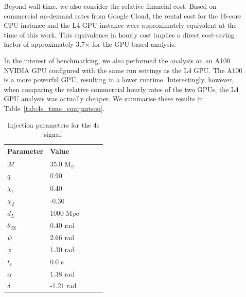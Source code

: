 \documentclass[fleqn,usenatbib]{mnras}
\begin{document}
Beyond wall-time, we also consider the relative financial cost. Based
on commercial on-demand rates from Google Cloud, the rental cost for the 16-core
CPU instance and the L4 GPU instance were approximately equivalent at
the time of this work. This equivalence in hourly cost implies a direct
cost-saving factor of approximately 3.7$\times$ for the GPU-based analysis.

In the interest of benchmarking, we also performed the analysis on 
an A100 NVIDIA GPU configured with the same run settings as the L4 GPU.
The A100 is a more powerful GPU, resulting in a lower runtime. Interestingly,
however, when comparing the relative commercial hourly rates of the two GPUs,
the L4 GPU analysis was actually cheaper. We summarise these results in 
Table~\ref{tab:4s_time_comparison}.

\begin{table}
    \centering
    \caption{Injection parameters for the 4s signal.}
    \label{tab:injection_params}
    \begin{tabular}{l l l c c}
    \hline
    \hline
    \textbf{Parameter} & \textbf{Value} \\
    \hline
    $\mathcal{M}$ & 35.0 M$_{\odot}$ \\
    $q$ & 0.90 \\
    $\chi_1$ & 0.40 \\
    $\chi_2$ & -0.30 \\
    $d_L$ & 1000 Mpc \\
    $\theta_{\textrm{JN}}$ & 0.40 rad \\
    $\psi$ & 2.66 rad \\
    $\phi$ & 1.30 rad \\
    $t_c$ & 0.0 s\\
    $\alpha$ & 1.38 rad \\
    $\delta$ & -1.21 rad \\
    \hline
    \hline
    \end{tabular}
    \end{table}
\end{document}
